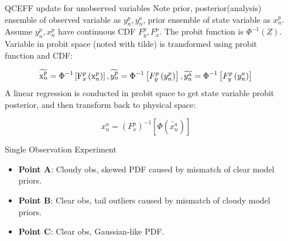 \documentclass[final]{beamer}
\newlength{\sepwidth}
\newlength{\colwidth}
\newcommand{\separatorcolumn}{\begin{column}{\sepwidth}\end{column}}
\begin{document}
\begin{frame}[t]
	\begin{columns}[t]
		\separatorcolumn
		
		\begin{column}{\colwidth}
			\begin{block}{QCEFF update for unobserved variables}
               Note prior, posterior(analysis) ensemble of observed variable as $y_n^p,y_n^a$, prior ensemble of state variable as $x_n^p$. Assume $y_n^p,x_n^p$ have continuous CDF $F_y^p,F_x^p$. The probit function is $\Phi^{-1}(Z)$. 
               Variable in probit space (noted with tilde) is transformed using probit function and CDF:

                \begin{equation}
                    \widetilde {{\rm{x}}_n^p} = {{\rm{\Phi }}^{ - 1}}\left[ {{\rm{F}}_x^p\left( {{\rm{x}}_n^p} \right)} \right],\widetilde {y_n^p} = {{\rm{\Phi }}^{ - 1}}\left[ {F_y^p\left( {y_n^p} \right)} \right],\widetilde {y_n^a} = {{\rm{\Phi }}^{ - 1}}\left[ {F_y^p\left( {y_n^a} \right)} \right]
                \end{equation}
               A linear regression is conducted in probit space to get state variable probit posterior, and then transform back to physical space:

                \begin{equation}
                    x_n^a=(F_x^p)^{-1}[\Phi(\widetilde{x_n^a})]
                \end{equation}
            


            \end{block}
			\begin{block}{Single Observation Experiment}
                \begin{itemize}
     
					\item \textbf{Point A}: Cloudy obs, skewed PDF caused by mismatch of clear model priors. 
     
					\item \textbf{Point B}: Clear obs, tail outliers caused by mismatch of cloudy model priors.
     
					\item \textbf{Point C}: Clear obs, Gaussian-like PDF.
     

\end{itemize}
\end{block}
\end{column}
\end{columns}
\end{frame}
\end{document}
